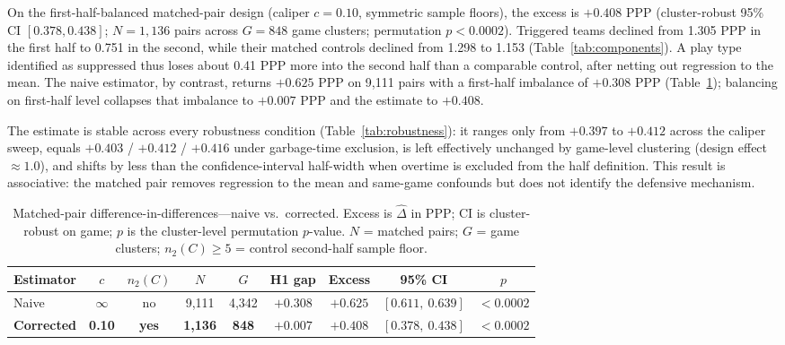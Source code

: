 \documentclass[11pt]{article}
\begin{document}
On the first-half-balanced matched-pair design (caliper $c=0.10$, symmetric sample floors), the excess is $+0.408$ PPP (cluster-robust 95\% CI $[0.378, 0.438]$; $N=1{,}136$ pairs across $G=848$ game clusters; permutation $p<0.0002$). Triggered teams declined from 1.305 PPP in the first half to 0.751 in the second, while their matched controls declined from 1.298 to 1.153 (Table~\ref{tab:components}). A play type identified as suppressed thus loses about 0.41 PPP more into the second half than a comparable control, after netting out regression to the mean. The naive estimator, by contrast, returns $+0.625$ PPP on 9,111 pairs with a first-half imbalance of $+0.308$ PPP (Table~\ref{tab:naive-corrected}); balancing on first-half level collapses that imbalance to $+0.007$ PPP and the estimate to $+0.408$.

The estimate is stable across every robustness condition (Table~\ref{tab:robustness}): it ranges only from $+0.397$ to $+0.412$ across the caliper sweep, equals $+0.403$ / $+0.412$ / $+0.416$ under garbage-time exclusion, is left effectively unchanged by game-level clustering (design effect $\approx 1.0$), and shifts by less than the confidence-interval half-width when overtime is excluded from the half definition. This result is associative: the matched pair removes regression to the mean and same-game confounds but does not identify the defensive mechanism.

\begin{table}[t]
\centering
\caption{Matched-pair difference-in-differences---naive vs.\ corrected. Excess is $\hat{\Delta}$ in PPP; CI is cluster-robust on game; $p$ is the cluster-level permutation $p$-value. $N$ = matched pairs; $G$ = game clusters; $n_2(C)\geq5$ = control second-half sample floor.}
\label{tab:naive-corrected}
\footnotesize
\setlength{\tabcolsep}{3.5pt}
\begin{tabular}{@{}lcccccccc@{}}
\toprule
Estimator & $c$ & $n_2(C)$ & $N$ & $G$ & H1 gap & Excess & 95\% CI & $p$ \\
\midrule
Naive & $\infty$ & no & 9,111 & 4,342 & $+0.308$ & $+0.625$ & $[0.611,\ 0.639]$ & $<0.0002$ \\
\textbf{Corrected} & \textbf{0.10} & \textbf{yes} & \textbf{1,136} & \textbf{848} & \textbf{$+0.007$} & \textbf{$+0.408$} & \textbf{$[0.378,\ 0.438]$} & \textbf{$<0.0002$} \\
\bottomrule
\end{tabular}
\end{table}
\end{document}
